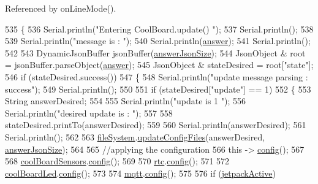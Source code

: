 Referenced by on\+Line\+Mode().


\begin{DoxyCode}
535 \{
536     Serial.println(\textcolor{stringliteral}{"Entering CoolBoard.update() "});
537     Serial.println();
538 
539     Serial.println(\textcolor{stringliteral}{"message is : "});
540     Serial.println(\hyperlink{classCoolBoard_a7b835fafd449e5282f7f91d787a2dc15}{answer});
541     Serial.println();
542 
543     DynamicJsonBuffer jsonBuffer(\hyperlink{classCoolBoard_af2da1f85315b3d074a8b87d158094fb7}{answerJsonSize});
544     JsonObject & root = jsonBuffer.parseObject(\hyperlink{classCoolBoard_a7b835fafd449e5282f7f91d787a2dc15}{answer});
545     JsonObject & stateDesired = root[\textcolor{stringliteral}{"state"}];
546     \textcolor{keywordflow}{if} (stateDesired.success())
547     \{
548         Serial.println(\textcolor{stringliteral}{"update message parsing : success"});
549         Serial.println();
550 
551         \textcolor{keywordflow}{if} (stateDesired[\textcolor{stringliteral}{"update"}] == 1)
552         \{
553             String answerDesired;
554 
555             Serial.println(\textcolor{stringliteral}{"update is 1 "});
556             Serial.println(\textcolor{stringliteral}{"desired update is : "});
557             
558             stateDesired.printTo(answerDesired);
559             
560             Serial.println(answerDesired);
561             Serial.println();
562             
563             \hyperlink{classCoolBoard_a42c2586fbb13ff7f06538e9284e8538d}{fileSystem}.\hyperlink{classCoolFileSystem_a32dad79ae80182a83e2e8f52286b7c7b}{updateConfigFiles}(answerDesired, 
      \hyperlink{classCoolBoard_af2da1f85315b3d074a8b87d158094fb7}{answerJsonSize});
564 
565             \textcolor{comment}{//applying the configuration    }
566             \textcolor{keyword}{this} -> \hyperlink{classCoolBoard_a583a874c09c07e70a6eb9229fc4beddb}{config}();
567 
568             \hyperlink{classCoolBoard_af102be5288bd7f7a8e59b13f86e26a00}{coolBoardSensors}.\hyperlink{classCoolBoardSensors_a9a218895c5423375c33c08f2c56fb23a}{config}();
569 
570             \hyperlink{classCoolBoard_a50d2a6716879d64a85f3c6b44ad63275}{rtc}.\hyperlink{classCoolTime_a87c28260c1bc77091162cbcf1ee2e129}{config}();
571 
572             \hyperlink{classCoolBoard_a1b1d3c684a5baa56b08486e192fd8e97}{coolBoardLed}.\hyperlink{classCoolBoardLed_a1b60e5e30bea96c49ed62ed1bf1ffc8b}{config}();
573 
574             \hyperlink{classCoolBoard_a2399f44d7c23c1149a335cb3b46d90f1}{mqtt}.\hyperlink{classCoolMQTT_a9b703de4f1358f0ee7a5e8c44979c648}{config}();
575 
576             \textcolor{keywordflow}{if} (\hyperlink{classCoolBoard_a9be03a913d26e558328935ca3b59a75e}{jetpackActive})

\end{DoxyCode}
